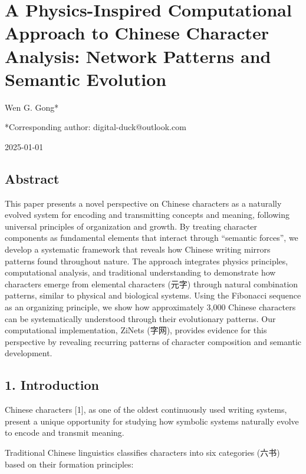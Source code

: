 \documentclass[
]{article}
\author{}
\date{}
\begin{document}
\section{A Physics-Inspired Computational Approach to Chinese Character
Analysis: Network Patterns and Semantic
Evolution}\label{a-physics-inspired-computational-approach-to-chinese-character-analysis-network-patterns-and-semantic-evolution}

Wen G. Gong*

*Corresponding author: digital-duck@outlook.com

2025-01-01

\subsection{Abstract}\label{abstract}

This paper presents a novel perspective on Chinese characters as a
naturally evolved system for encoding and transmitting concepts and
meaning, following universal principles of organization and growth. By
treating character components as fundamental elements that interact
through ``semantic forces'', we develop a systematic framework that
reveals how Chinese writing mirrors patterns found throughout nature.
The approach integrates physics principles, computational analysis, and
traditional understanding to demonstrate how characters emerge from
elemental characters (元字) through natural combination patterns,
similar to physical and biological systems. Using the Fibonacci sequence
as an organizing principle, we show how approximately 3,000 Chinese
characters can be systematically understood through their evolutionary
patterns. Our computational implementation, ZiNets (字网), provides
evidence for this perspective by revealing recurring patterns of
character composition and semantic development.

\subsection{1. Introduction}\label{introduction}

Chinese characters {[}1{]}, as one of the oldest continuously used
writing systems, present a unique opportunity for studying how symbolic
systems naturally evolve to encode and transmit meaning.

Traditional Chinese linguistics classifies characters into six
categories (六书) based on their formation principles:
\end{document}

